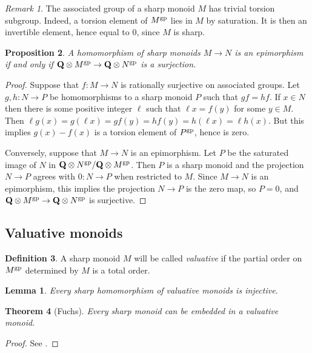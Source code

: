 \documentclass[12pt]{amsart}
\theoremstyle{plan}
\newtheorem{theorem}{Theorem}
\newtheorem{proposition}[theorem]{Proposition}
\newtheorem{lemma}{Lemma}
\numberwithin{lemma}{theorem}
\numberwithin{corollary}{theorem}
\theoremstyle{definition}
\newtheorem{definition}[theorem]{Definition}
\theoremstyle{remark}
\newtheorem{remark}[theorem]{Remark}
\begin{document}
\begin{remark}
The associated group of a sharp monoid $M$ has trivial torsion subgroup.  Indeed, a torsion element of $M^{\rm gp}$ lies in $M$ by saturation.  It is then an invertible element, hence equal to $0$, since $M$ is sharp.
\end{remark}

\begin{proposition}
A homomorphism of sharp monoids $M \to N$ is an epimorphism if and only if $\mathbf Q \otimes M^{\rm gp} \to \mathbf Q \otimes N^{\rm gp}$ is a surjection.
\end{proposition}
\begin{proof}
Suppose that $f : M \to N$ is rationally surjective on associated groups.  Let $g,h : N \to P$ be homomorphisms to a sharp monoid $P$ such that $gf = hf$.  If $x \in N$ then there is some positive integer $\ell$ such that $\ell x = f(y)$ for some $y \in M$.  Then $\ell g(x) = g(\ell x) = gf(y) = hf(y) = h(\ell x) = \ell h(x)$.  But this implies $g(x) - f(x)$ is a torsion element of $P^{\rm gp}$, hence is zero.

Conversely, suppose that $M \to N$ is an epimorphism.  Let $P$ be the saturated image of $N$ in $\mathbf Q \otimes N^{\rm gp} / \mathbf Q \otimes M^{\rm gp}$.  Then $P$ is a sharp monoid and the projection $N \to P$ agrees with $0 : N \to P$ when restricted to $M$.  Since $M \to N$ is an epimorphism, this implies the projection $N \to P$ is the zero map, so $P = 0$, and $\mathbf Q \otimes M^{\rm gp} \to \mathbf Q \otimes N^{\rm gp}$ is surjective.
\end{proof}

\subsection{Valuative monoids}

\begin{definition}
A sharp monoid $M$ will be called \emph{valuative} if the partial order on $M^{\rm gp}$ determined by $M$ is a total order.
\end{definition}

\begin{lemma}
Every sharp homomorphism of valuative monoids is injective.
\end{lemma}

\begin{theorem}[Fuchs]
Every sharp monoid can be embedded in a valuative monoid.
\end{theorem}
\begin{proof}
See \cite[Theorem~2]{Fuchs}.
\end{proof}
\end{document}
